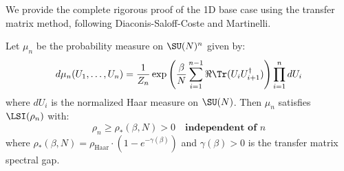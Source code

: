 We provide the complete rigorous proof of the 1D base case using the transfer 
matrix method, following Diaconis-Saloff-Coste and Martinelli.

\begin{theorem}
\label{thm:1d-uniform-complete-app83_framework_for_closing_the_uniform-in-l_gap}
Let $\mu_n$ be the probability measure on $\SU(N)^n$ given by:
\[
d\mu_n(U_1, \ldots, U_n) = \frac{1}{Z_n} \exp\left(\frac{\beta}{N}\sum_{i=1}^{n-1} \Re\Tr(U_i U_{i+1}^\dagger)\right) \prod_{i=1}^n dU_i
\]
where $dU_i$ is the normalized Haar measure on $\SU(N)$. Then $\mu_n$ satisfies 
$\LSI(\rho_n)$ with:
\[
\rho_n \geq \rho_*(\beta, N) > 0 \quad \textbf{independent of } n
\]
where $\rho_*(\beta, N) = \rho_{\mathrm{Haar}} \cdot (1 - e^{-\gamma(\beta)})$ and $\gamma(\beta) > 0$ 
is the transfer matrix spectral gap.
\end{theorem}

